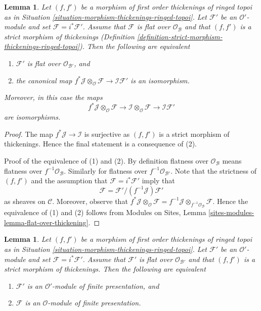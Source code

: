 \documentclass{stacks-project}
\theoremstyle{plain}
\newtheorem{lemma}[subsection]{Lemma}
\theoremstyle{definition}
\theoremstyle{remark}
\numberwithin{equation}{subsection}
\begin{document}
\begin{lemma}
\label{lemma-deform-module-ringed-topoi}
Let $(f, f')$ be a morphism of first order thickenings of ringed topoi
as in Situation \ref{situation-morphism-thickenings-ringed-topoi}.
Let $\mathcal{F}'$ be an $\mathcal{O}'$-module
and set $\mathcal{F} = i^*\mathcal{F}'$.
Assume that $\mathcal{F}$ is flat over $\mathcal{O}_\mathcal{B}$
and that $(f, f')$ is a strict morphism of thickenings
(Definition \ref{definition-strict-morphism-thickenings-ringed-topoi}).
Then the following are equivalent
\begin{enumerate}
\item $\mathcal{F}'$ is flat over $\mathcal{O}_{\mathcal{B}'}$, and
\item the canonical map
$f^*\mathcal{J} \otimes_\mathcal{O} \mathcal{F} \to
\mathcal{I}\mathcal{F}'$
is an isomorphism.
\end{enumerate}
Moreover, in this case the maps
$$
f^*\mathcal{J} \otimes_\mathcal{O} \mathcal{F} \to
\mathcal{I} \otimes_\mathcal{O} \mathcal{F} \to
\mathcal{I}\mathcal{F}'
$$
are isomorphisms.
\end{lemma}

\begin{proof}
The map $f^*\mathcal{J} \to \mathcal{I}$ is surjective
as $(f, f')$ is a strict morphism of thickenings.
Hence the final statement is a consequence of (2).

\medskip\noindent
Proof of the equivalence of (1) and (2). By definition flatness over
$\mathcal{O}_\mathcal{B}$ means flatness over $f^{-1}\mathcal{O}_\mathcal{B}$.
Similarly for flatness over $f^{-1}\mathcal{O}_{\mathcal{B}'}$.
Note that the strictness of $(f, f')$ and the assumption that
$\mathcal{F} = i^*\mathcal{F}'$ imply that
$$
\mathcal{F} = \mathcal{F}'/(f^{-1}\mathcal{J})\mathcal{F}'
$$
as sheaves on $\mathcal{C}$. Moreover, observe that
$f^*\mathcal{J} \otimes_\mathcal{O} \mathcal{F} =
f^{-1}\mathcal{J} \otimes_{f^{-1}\mathcal{O}_\mathcal{B}} \mathcal{F}$.
Hence the equivalence of (1) and (2) follows from
Modules on Sites, Lemma \ref{sites-modules-lemma-flat-over-thickening}.
\end{proof}

\begin{lemma}
\label{lemma-deform-fp-module-ringed-topoi}
Let $(f, f')$ be a morphism of first order thickenings of ringed topoi
as in Situation \ref{situation-morphism-thickenings-ringed-topoi}.
Let $\mathcal{F}'$ be an $\mathcal{O}'$-module
and set $\mathcal{F} = i^*\mathcal{F}'$.
Assume that $\mathcal{F}'$ is flat over $\mathcal{O}_{\mathcal{B}'}$
and that $(f, f')$ is a strict morphism of thickenings.
Then the following are equivalent
\begin{enumerate}
\item $\mathcal{F}'$ is an $\mathcal{O}'$-module of finite presentation, and
\item $\mathcal{F}$ is an $\mathcal{O}$-module of finite presentation.
\end{enumerate}
\end{lemma}
\end{document}
